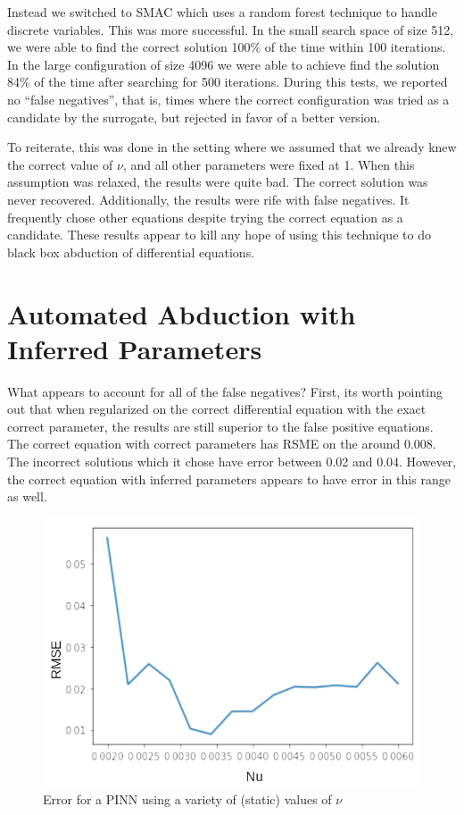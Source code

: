 \documentclass[12pt, fullpage,letterpaper]{article}
\begin{document}
Instead we switched to SMAC which uses a random forest technique to handle discrete variables. This was more successful. In the small search space of size 512, we were able to find the correct solution 100\% of the time within 100 iterations. In the large configuration of size 4096 we were able to achieve find the solution 84\% of the time after searching for 500 iterations. During this tests, we reported no ``false negatives'', that is, times where the correct configuration was tried as a candidate by the surrogate, but rejected in favor of a better version.

To reiterate, this was done in the setting where we assumed that we already knew the correct value of $\nu$, and all other parameters were fixed at 1. When this assumption was relaxed, the results were quite bad. The correct solution was never recovered. Additionally, the results were rife with false negatives. It frequently chose other equations despite trying the correct equation as a candidate. These results appear to kill any hope of using this technique to do black box abduction of differential equations.

\section{Automated Abduction with Inferred Parameters}

What appears to account for all of the false negatives? First, its worth pointing out that when regularized on the correct differential equation with the exact correct parameter, the results are still superior to the false positive equations. The correct equation with correct parameters has RSME on the around 0.008. The incorrect solutions which it chose have error between 0.02 and 0.04. However, the correct equation with inferred parameters appears to have error in this range as well. 

\begin{figure}[!htb]
    \centering
    \includegraphics[width=\textwidth]{nu-scaling-labeled}
    \caption{Error for a PINN using a variety of (static) values of $\nu$}
    \label{fig:burgers-nu-sensitivity}
\end{figure}
\end{document}

